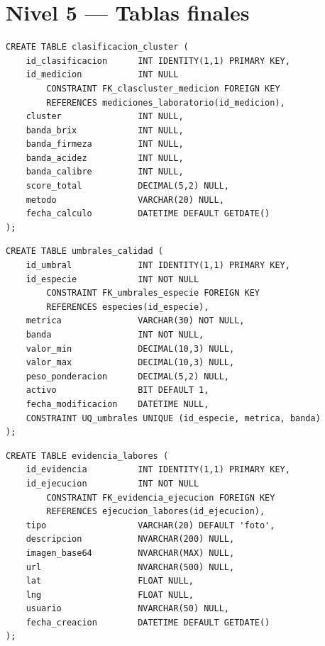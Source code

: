 \documentclass[12pt,a4paper,twoside]{report}
\begin{document}
\section{Nivel 5 --- Tablas finales}

\begin{lstlisting}[style=sqlstyle, caption={clasificacion\_cluster}]
CREATE TABLE clasificacion_cluster (
    id_clasificacion      INT IDENTITY(1,1) PRIMARY KEY,
    id_medicion           INT NULL
        CONSTRAINT FK_clascluster_medicion FOREIGN KEY
        REFERENCES mediciones_laboratorio(id_medicion),
    cluster               INT NULL,
    banda_brix            INT NULL,
    banda_firmeza         INT NULL,
    banda_acidez          INT NULL,
    banda_calibre         INT NULL,
    score_total           DECIMAL(5,2) NULL,
    metodo                VARCHAR(20) NULL,
    fecha_calculo         DATETIME DEFAULT GETDATE()
);
\end{lstlisting}

\begin{lstlisting}[style=sqlstyle, caption={umbrales\_calidad}]
CREATE TABLE umbrales_calidad (
    id_umbral             INT IDENTITY(1,1) PRIMARY KEY,
    id_especie            INT NOT NULL
        CONSTRAINT FK_umbrales_especie FOREIGN KEY
        REFERENCES especies(id_especie),
    metrica               VARCHAR(30) NOT NULL,
    banda                 INT NOT NULL,
    valor_min             DECIMAL(10,3) NULL,
    valor_max             DECIMAL(10,3) NULL,
    peso_ponderacion      DECIMAL(5,2) NULL,
    activo                BIT DEFAULT 1,
    fecha_modificacion    DATETIME NULL,
    CONSTRAINT UQ_umbrales UNIQUE (id_especie, metrica, banda)
);
\end{lstlisting}

\begin{lstlisting}[style=sqlstyle, caption={evidencia\_labores}]
CREATE TABLE evidencia_labores (
    id_evidencia          INT IDENTITY(1,1) PRIMARY KEY,
    id_ejecucion          INT NOT NULL
        CONSTRAINT FK_evidencia_ejecucion FOREIGN KEY
        REFERENCES ejecucion_labores(id_ejecucion),
    tipo                  VARCHAR(20) DEFAULT 'foto',
    descripcion           NVARCHAR(200) NULL,
    imagen_base64         NVARCHAR(MAX) NULL,
    url                   NVARCHAR(500) NULL,
    lat                   FLOAT NULL,
    lng                   FLOAT NULL,
    usuario               NVARCHAR(50) NULL,
    fecha_creacion        DATETIME DEFAULT GETDATE()
);
\end{lstlisting}
\end{document}
